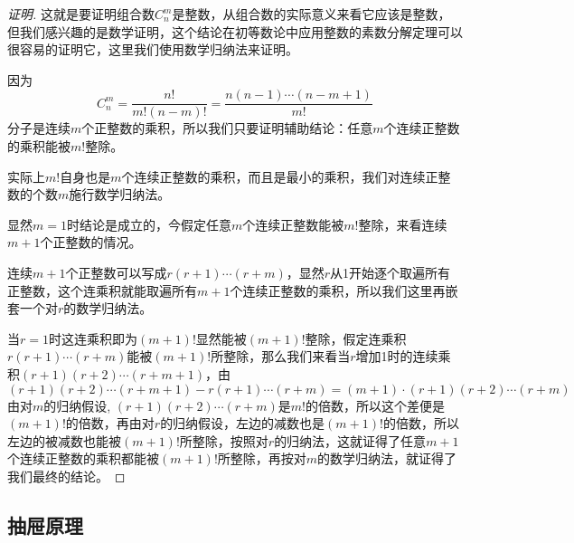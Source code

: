 \begin{proof}[证明]
  这就是要证明组合数$C_n^m$是整数，从组合数的实际意义来看它应该是整数，但我们感兴趣的是数学证明，这个结论在初等数论中应用整数的素数分解定理可以很容易的证明它，这里我们使用数学归纳法来证明。

  因为
  \[ C_n^m = \frac{n!}{m!(n-m)!} = \frac{n(n-1)\cdots(n-m+1)}{m!} \]
  分子是连续$m$个正整数的乘积，所以我们只要证明辅助结论：任意$m$个连续正整数的乘积能被$m!$整除。

  实际上$m!$自身也是$m$个连续正整数的乘积，而且是最小的乘积，我们对连续正整数的个数$m$施行数学归纳法。

  显然$m=1$时结论是成立的，今假定任意$m$个连续正整数能被$m!$整除，来看连续$m+1$个正整数的情况。

  连续$m+1$个正整数可以写成$r(r+1)\cdots (r+m)$，显然$r$从1开始逐个取遍所有正整数，这个连乘积就能取遍所有$m+1$个连续正整数的乘积，所以我们这里再嵌套一个对$r$的数学归纳法。

  当$r=1$时这连乘积即为$(m+1)!$显然能被$(m+1)!$整除，假定连乘积$r(r+1)\cdots (r+m)$能被$(m+1)!$所整除，那么我们来看当$r$增加1时的连续乘积$(r+1)(r+2)\cdots (r+m+1)$，由
  \[ (r+1)(r+2) \cdots (r+m+1) - r(r+1) \cdots (r+m) = (m+1) \cdot (r+1)(r+2) \cdots (r+m) \]
  由对$m$的归纳假设, $(r+1)(r+2) \cdots (r+m)$是$m!$的倍数，所以这个差便是$(m+1)!$的倍数，再由对$r$的归纳假设，左边的减数也是$(m+1)!$的倍数，所以左边的被减数也能被$(m+1)!$所整除，按照对$r$的归纳法，这就证得了任意$m+1$个连续正整数的乘积都能被$(m+1)!$所整除，再按对$m$的数学归纳法，就证得了我们最终的结论。
\end{proof}


\subsection{抽屉原理}
\label{sec:drawer-principle}



